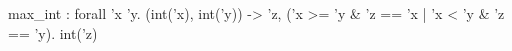 max_int : forall 'x 'y. (int('x), int('y)) -> {'z, ('x >= 'y & 'z == 'x | 'x < 'y & 'z == 'y). int('z)}